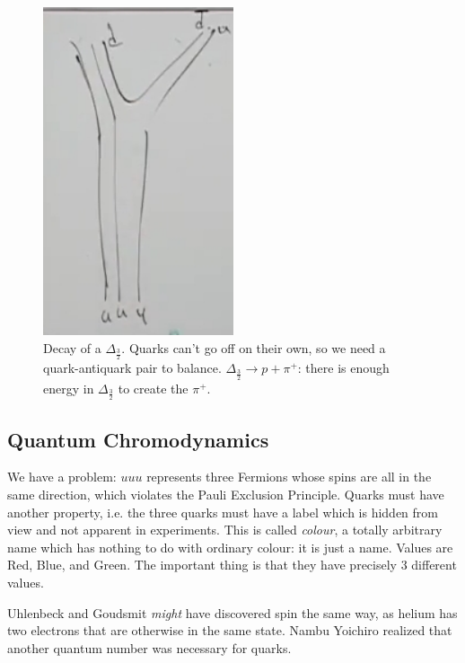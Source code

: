 \documentclass[]{article}
\begin{document}
\begin{figure}[H]
	\begin{center}
		\caption[Decay of a $\Delta_\frac{3}{2}$]{Decay of a $\Delta_\frac{3}{2}$. Quarks can't go off on their own, so we need a quark-antiquark pair to balance. $\Delta_\frac{3}{2}\rightarrow p +\pi^+$: there is enough energy in $\Delta_\frac{3}{2}$ to create the $\pi^+$.}\label{fig:decay:delta}
		\includegraphics[width=0.5\textwidth]{2-2-Delta-decay}
	\end{center}
\end{figure}

\subsection{Quantum Chromodynamics}

We have a problem: $uuu$ represents three Fermions whose spins are all in the same direction, which violates the Pauli Exclusion Principle. Quarks must have another property, i.e. the three quarks must have a label which is hidden from view and not apparent in experiments. This is called \emph{colour}, a totally arbitrary name which has nothing to do with ordinary colour: it is just a name. Values are Red, Blue, and Green. The important thing is that they have precisely 3 different values.

Uhlenbeck and Goudsmit  \emph{might} have  discovered spin the same way, as helium has two electrons that are otherwise in the same state. Nambu Yoichiro realized that another quantum number was necessary for quarks.
\end{document}
